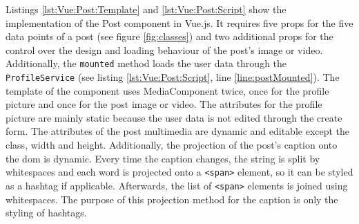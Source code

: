 \documentclass[a4paper, 12pt]{article}
\begin{document}
Listings \ref{lst:Vue:Post:Template} and \ref{lst:Vue:Post:Script} show the implementation of the Post component in Vue.js.
It requires five props for the five data points of a post (see figure \ref{fig:classes}) and two additional props for the control over the design and loading behaviour of the post's image or video.
Additionally, the \verb|mounted| method loads the user data through the \verb|ProfileService| (see listing \ref{lst:Vue:Post:Script}, line \ref{line:postMounted}).
The template of the component uses MediaComponent twice, once for the profile picture and once for the post image or video.
The attributes for the profile picture are mainly static because the user data is not edited through the create form.
The attributes of the post multimedia are dynamic and editable except the class, width and height.
Additionally, the projection of the post's caption onto the \acrshort{dom} is dynamic.
Every time the caption changes, the string is split by whitespaces and each word is projected onto a \verb|<span>| element, so it can be styled as a hashtag if applicable.
Afterwards, the list of \verb|<span>| elements is joined using whitespaces.
The purpose of this projection method for the caption is only the styling of hashtags.
\end{document}
